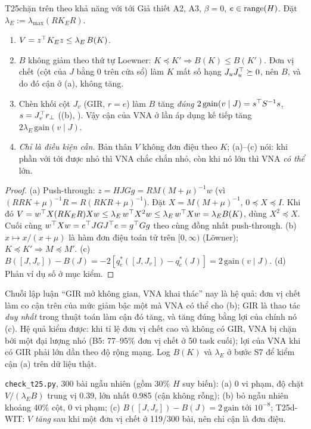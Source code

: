 \begin{namedthm}{T25}{chặn trên theo khả năng với tới}
Giả thiết A2, A3, $\beta=0$, $e\in\operatorname{range}(H)$. Đặt $\lambda_E:=\lambda_{\max}(RK_ER)$.
\begin{enumerate}[label=(\alph*)]
\item $V=z^{\top} K_Ez\le\lambda_E\,B(K)$.
\item $B$ không giảm theo thứ tự Loewner: $K\preceq K'\Rightarrow B(K)\le B(K')$. Đơn vị chết (cột của $J$ bằng $0$ trên cửa sổ) làm $K$ mất số hạng $J_uJ_u^{\top}\succeq0$, nên $B$, và do đó cận ở (a), không tăng.
\item Chèn khối cột $J_v$ (GIR, $r=e$) làm $B$ tăng \emph{đúng} $2\,\mathrm{gain}(v\mid J)=s^{\top} S^{-1}s$, $s=J_v^{\top}r_{\perp}$ ((b), ). Vậy cận của VNA ở lần áp dụng kế tiếp tăng $2\lambda_E\,\mathrm{gain}(v\mid J)$.
\item \emph{Chỉ là điều kiện cần.} Bản thân $V$ không đơn điệu theo $K$; (a)--(c) nói: khi phần với tới được nhỏ thì VNA chắc chắn nhỏ, còn khi nó lớn thì VNA \emph{có thể} lớn.
\end{enumerate}
\end{namedthm}
\begin{proof}
(a) Push-through: $z=HJGg=RM(M+\mu)^{-1}w$ (vì $(RRK+\mu)^{-1}R=R(RKR+\mu)^{-1}$). Đặt $X=M(M+\mu)^{-1}$, $0\preceq X\preceq I$. Khi đó $V=w^{\top} X(RK_ER)Xw\le\lambda_E\,w^{\top} X^2w\le\lambda_E\,w^{\top} Xw=\lambda_E B(K)$, dùng $X^2\preceq X$. Cuối cùng $w^{\top} Xw=e^{\top} JGJ^{\top} e=g^{\top} Gg$ theo cùng đồng nhất push-through.
(b) $x\mapsto x/(x+\mu)$ là hàm đơn điệu toán tử trên $[0,\infty)$ (Löwner); $K\preceq K'\Rightarrow M\preceq M'$.
(c) $B([J,J_v])-B(J)=-2[q^*_e([J,J_v])-q^*_e(J)]=2\,\mathrm{gain}(v\mid J)$.
(d) Phản ví dụ số ở mục kiểm.
\end{proof}
\begin{hequa}
Chuỗi lập luận ``GIR mở không gian, VNA khai thác'' nay là hệ quả: đơn vị chết làm co cận trên của mức giảm bậc một mà VNA có thể cho (b); GIR là thao tác \emph{duy nhất} trong thuật toán làm cận đó tăng, và tăng đúng bằng lợi của chính nó (c). Hệ quả kiểm được: khi tỉ lệ đơn vị chết cao và không có GIR, VNA bị chặn bởi một đại lượng nhỏ (B5: 77--95\% đơn vị chết ở 50 task cuối); lợi của VNA khi có GIR phải lớn dần theo độ rộng mạng. Log $B(K)$ và $\lambda_E$ ở bước S7 để kiểm cận (a) trên dữ liệu thật.
\end{hequa}
\begin{kiem}
\texttt{check\_t25.py}, 300 bài ngẫu nhiên (gồm 30\% $H$ suy biến): (a) 0 vi phạm, độ chặt $V/(\lambda_EB)$ trung vị 0.39, lớn nhất 0.985 (cận không rỗng); (b) bỏ ngẫu nhiên khoảng 40\% cột, 0 vi phạm; (c) $B([J,J_v])-B(J)=2\,\mathrm{gain}$ tới $10^{-8}$; T25d-WIT: $V$ \emph{tăng} sau khi một đơn vị chết ở 119/300 bài, nên chỉ cận là đơn điệu.
\end{kiem}
